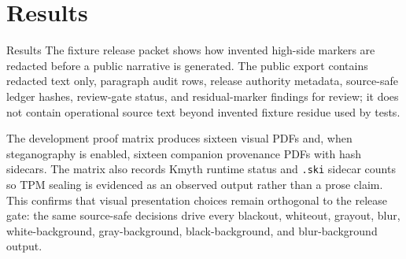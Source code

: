 \documentclass[
  ignorenonframetext,
]{beamer}
\author{\texorpdfstring{}{}}
\date{}
\begin{document}
\section{Results}\label{results}

\begin{frame}{Results}
The fixture release packet shows how invented high-side markers are
redacted before a public narrative is generated. The public export
contains redacted text only, paragraph audit rows, release authority
metadata, source-safe ledger hashes, review-gate status, and
residual-marker findings for review; it does not contain operational
source text beyond invented fixture residue used by tests.

The development proof matrix produces sixteen visual PDFs and, when
steganography is enabled, sixteen companion provenance PDFs with hash
sidecars. The matrix also records Kmyth runtime status and \texttt{.ski}
sidecar counts so TPM sealing is evidenced as an observed output rather
than a prose claim. This confirms that visual presentation choices
remain orthogonal to the release gate: the same source-safe decisions
drive every blackout, whiteout, grayout, blur, white-background,
gray-background, black-background, and blur-background output.
\end{frame}
\end{document}
